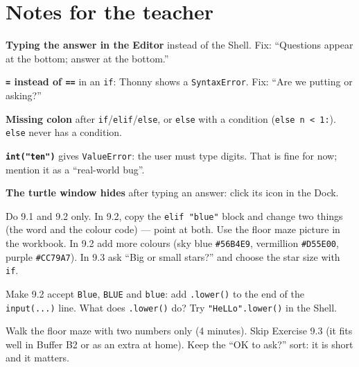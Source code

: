 \section{Notes for the teacher}
\begin{commonmistakes}
  \item \textbf{Typing the answer in the Editor} instead of the Shell. Fix: \enquote{Questions appear at the bottom; answer at the bottom.}
  \item \textbf{\texttt{=} instead of \texttt{==}} in an \texttt{if}: Thonny shows a \texttt{SyntaxError}. Fix: \enquote{Are we putting or asking?}
  \item \textbf{Missing colon} after \texttt{if}/\texttt{elif}/\texttt{else}, or \texttt{else} with a condition (\texttt{else n < 1:}). \texttt{else} never has a condition.
  \item \textbf{\texttt{int("ten")}} gives \texttt{ValueError}: the user must type digits. That is fine for now; mention it as a \enquote{real-world bug}.
  \item \textbf{The turtle window hides} after typing an answer: click its icon in the Dock.
\end{commonmistakes}
\begin{differentiation}
\supportpath Do 9.1 and 9.2 only. In 9.2, copy the \texttt{elif "blue"} block and change two things (the word and the colour code) --- point at both. Use the floor maze picture in the workbook.
\extensionpath In 9.2 add more colours (sky blue \texttt{\#56B4E9}, vermillion \texttt{\#D55E00}, purple \texttt{\#CC79A7}). In 9.3 ask \enquote{Big or small stars?} and choose the star size with \texttt{if}.
\end{differentiation}
\begin{stretchchallenge}
Make 9.2 accept \texttt{Blue}, \texttt{BLUE} and \texttt{blue}: add \texttt{.lower()} to the end of the \texttt{input(...)} line. What does \texttt{.lower()} do? Try \texttt{"HeLLo".lower()} in the Shell.
\end{stretchchallenge}
\begin{teachernote}
Walk the floor maze with two numbers only (4 minutes). Skip Exercise 9.3 (it fits well in Buffer B2 or as an extra at home). Keep the \enquote{OK to ask?} sort: it is short and it matters.
\end{teachernote}
